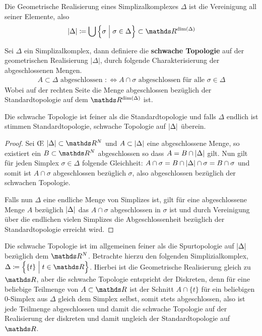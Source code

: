 \begin{Def}
  Die Geometrische Realisierung eines Simplizalkomplexes $\Delta$ ist
  die Vereinigung all seiner Elemente, also
  \begin{gather*}
    |\Delta| \coloneqq \bigcup \left\{ \sigma \; \Big| \; \sigma \in
      \Delta \right\} \subset \R^{\dim(\Delta)}
  \end{gather*}
\end{Def}

\begin{Def}
  Sei $\Delta$ ein Simplizalkomplex, dann definiere die
  \textbf{schwache Topologie} auf der geometrischen Realisierung $| \Delta |$,
  durch folgende Charakterisierung der abgeschlossenen Mengen.
  \begin{gather*}
    A \subset \Delta \text{ abgeschlossen } :\Leftrightarrow A \cap
    \sigma \text{ abgeschlossen für alle } \sigma \in \Delta
  \end{gather*}
  Wobei auf der rechten Seite die Menge abgeschlossen bezüglich der
  Standardtopologie auf dem $\R^{\dim(\Delta)}$ ist.
\end{Def}

\begin{Lem}
  Die schwache Topologie ist feiner als die Standardtopologie und
  falls $\Delta$ endlich ist stimmen Standardtopologie, schwache
  Topologie auf $\left| \Delta \right|$ überein.
  \begin{proof}
    Sei \OE\; $\gr{\Delta} \subset \R^N$ und $A \subset \left| \Delta \right|$
    eine abgeschlossene Menge, so existiert ein $B \subset \R^N$
    abgeschlossen so dass $A = B \cap \left| \Delta \right|$ gilt. Nun gilt für
    jeden Simplex $\sigma \in \Delta$ folgende Gleichheit:
    $A \cap \sigma = B \cap \left| \Delta \right| \cap \sigma = B \cap \sigma$
    und somit ist $A \cap \sigma$ abgeschlossen bezüglich $\sigma$,
    also abgeschlossen bezüglich der schwachen Topologie.

    Falls nun $\Delta$ eine endliche Menge von Simplizes ist, gilt für
    eine abgeschlossene Menge $A$ bezüglich $\left| \Delta \right|$ das
    $A \cap \sigma$ abgeschlossen in $\sigma$ ist und durch
    Vereinigung über die endlichen vielen Simplizes die
    Abgeschlossenheit bezüglich der Standardtopologie erreicht wird.
  \end{proof}
\end{Lem}

\begin{Bem}
  Die schwache Topologie ist im allgemeinen feiner als die
  Spurtopologie auf $\left| \Delta \right|$ bezüglich dem $\R^N$. Betrachte
  hierzu den folgenden Simplizialkomplex,
  $\Delta \coloneqq \set{ \{t\} }{t \in \R}$.  Hierbei ist die
  Geometrische Realisierung gleich zu $\R$, aber die schwache
  Topologie entspricht der Diskreten, denn für eine beliebige
  Teilmenge von $A \subset \R$ ist der Schnitt $A \cap \{ t \}$ für
  ein beliebigen $0$-Simplex aus $\Delta$ gleich dem Simplex selbst,
  somit stets abgeschlossen, also ist jede Teilmenge abgeschlossen und
  damit die schwache Topologie auf der Realisierung der diskreten und
  damit ungleich der Standardtopologie auf $\R$.
\end{Bem}



